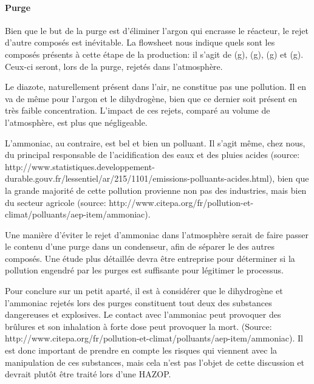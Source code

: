 \documentclass[10pt,a4paper]{report}
\begin{document}
 \paragraph{Purge}
 Bien que le but de la purge est d'éliminer l'argon qui encrasse le réacteur, le rejet d'autre composés est inévitable. La flowsheet nous indique quels sont les composés présents à cette étape de la production: il s'agit de (g), (g), (g) et (g). Ceux-ci seront, lors de la purge, rejetés dans l'atmosphère.
 
 Le diazote, naturellement présent dans l'air, ne constitue pas une pollution. Il en va de même pour l'argon et le dihydrogène, bien que ce dernier soit présent en très faible concentration. L'impact de ces rejets, comparé au volume de l'atmosphère, est plus que négligeable.
 
 L'ammoniac, au contraire, est bel et bien un polluant. Il s'agit même, chez nous, du principal responsable de l'acidification des eaux et des pluies acides (source: http://www.statistiques.developpement-durable.gouv.fr/lessentiel/ar/215/1101/emissions-polluants-acides.html), bien que la grande majorité de cette pollution provienne non pas des industries, mais bien du secteur agricole (source: http://www.citepa.org/fr/pollution-et-climat/polluants/aep-item/ammoniac).
 
 Une manière d'éviter le rejet d'ammoniac dans l'atmosphère serait de faire passer le contenu d'une purge dans un condenseur, afin de séparer le  des autres composés. Une étude plus détaillée devra être entreprise pour déterminer si la pollution engendré par les purges est suffisante pour légitimer le processus.
 
 Pour conclure sur un petit aparté, il est à considérer que le dihydrogène et l'ammoniac rejetés lors des purges constituent tout deux des substances dangereuses et explosives. Le contact avec l'ammoniac peut provoquer des brûlures et son inhalation à forte dose peut provoquer la mort. (Source: http://www.citepa.org/fr/pollution-et-climat/polluants/aep-item/ammoniac). Il est donc important de prendre en compte les risques qui viennent avec la manipulation de ces substances, mais cela n'est pas l'objet de cette discussion et devrait plutôt être traité lors d'une HAZOP.
 
\end{document}
